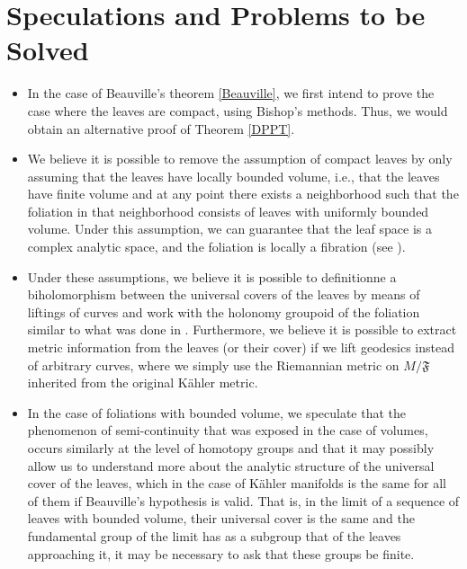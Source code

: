 \documentclass[12pt,twoside,a4paper]{report}
\begin{document}
\section{Speculations and Problems to be Solved}
\begin{itemize}
        \item In the case of Beauville's theorem \ref{Beauville}, we first intend to prove the case where
        the leaves are compact, using Bishop's methods. Thus, we would obtain an alternative proof of
        Theorem \ref{DPPT}.

        \item We believe it is possible to remove the assumption of compact leaves by only assuming that the
        leaves have locally bounded volume, i.e., that the leaves have finite volume and at any point there exists
        a neighborhood such that the foliation in that neighborhood consists of leaves with uniformly bounded volume. Under this
        assumption, we can guarantee that the leaf space is a complex analytic space, and the foliation is
        locally a fibration (see \cite{A-V}).

        \item Under these assumptions, we believe it is possible to definitionne a biholomorphism between the universal covers
        of the leaves by means of liftings of curves and work with the holonomy groupoid of the foliation
        similar to what was done in \cite{DPPT}. Furthermore, we believe it is possible to extract metric information from the
        leaves (or their cover) if we lift geodesics instead of arbitrary curves, where we simply use the
        Riemannian metric on $M/\mathfrak{F}$ inherited from the original Kähler metric.

        \item In the case of foliations with bounded volume, we speculate that the phenomenon of semi-continuity that was exposed in the case
        of volumes, occurs similarly at the level of homotopy groups and that it may possibly allow us to understand more about the
        analytic structure of the universal cover of the leaves, which in the case of Kähler manifolds is the same for all of them
        if Beauville's hypothesis is valid. That is, in the limit of a sequence of leaves with bounded volume, their universal
        cover is the same and the fundamental group of the limit has as a subgroup that of the leaves approaching it,
        it may be necessary to ask that these groups be finite.


\end{itemize}
\end{document}
